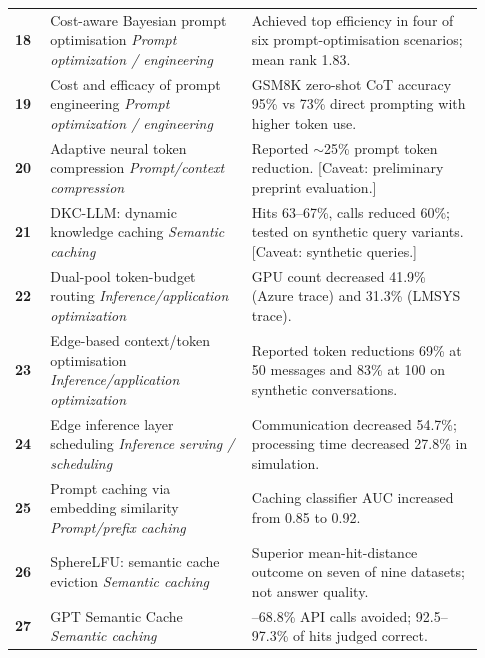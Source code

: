 \IfFileExists{jair.cls}{\documentclass{jair}}{\documentclass[manuscript,nonacm,screen]{acmart}}
\begin{document}
{\begin{longtable}{@{}>{\RaggedRight\arraybackslash}p{0.07\linewidth} >{\RaggedRight\arraybackslash}p{0.40\linewidth} >{\RaggedRight\arraybackslash}p{0.46\linewidth}@{}}
\textbf{18} & Cost-aware Bayesian prompt optimisation \cite{S18}\newline\emph{Prompt optimization / engineering} & Achieved top efficiency in four of six prompt-optimisation scenarios; mean rank 1.83. \\
\textbf{19} & Cost and efficacy of prompt engineering \cite{S19}\newline\emph{Prompt optimization / engineering} & GSM8K zero-shot CoT accuracy 95\% vs 73\% direct prompting with higher token use. \\
\textbf{20} & Adaptive neural token compression \cite{S20}\newline\emph{Prompt/context compression} & Reported $\sim$25\% prompt token reduction. [Caveat: preliminary preprint evaluation.] \\
\textbf{21} & DKC-LLM: dynamic knowledge caching \cite{S21}\newline\emph{Semantic caching} & Hits 63--67\%, calls reduced 60\%; tested on synthetic query variants. [Caveat: synthetic queries.] \\
\textbf{22} & Dual-pool token-budget routing \cite{S22}\newline\emph{Inference/application optimization} & GPU count decreased 41.9\% (Azure trace) and 31.3\% (LMSYS trace). \\
\textbf{23} & Edge-based context/token optimisation \cite{S23}\newline\emph{Inference/application optimization} & Reported token reductions 69\% at 50 messages and 83\% at 100 on synthetic conversations. \\
\textbf{24} & Edge inference layer scheduling \cite{S24}\newline\emph{Inference serving / scheduling} & Communication decreased 54.7\%; processing time decreased 27.8\% in simulation. \\
\textbf{25} & Prompt caching via embedding similarity \cite{S25}\newline\emph{Prompt/prefix caching} & Caching classifier AUC increased from 0.85 to 0.92. \\
\textbf{26} & SphereLFU: semantic cache eviction \cite{S26}\newline\emph{Semantic caching} & Superior mean-hit-distance outcome on seven of nine datasets; not answer quality. \\
\textbf{27} & GPT Semantic Cache \cite{S27}\newline\emph{Semantic caching} & 61.6--68.8\% API calls avoided; 92.5--97.3\% of hits judged correct. \\

\end{longtable}}
\end{document}
